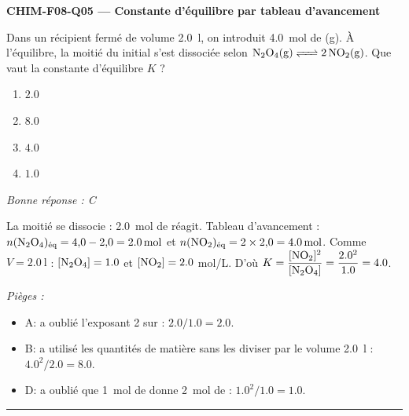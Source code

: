 \documentclass[11pt,a4paper]{article}
\begin{document}
\noindent\textbf{CHIM-F08-Q05 --- Constante d'équilibre par tableau d'avancement}\par
Dans un récipient fermé de volume \qty{2.0}{\litre}, on introduit \qty{4.0}{\mol} de (g). À l'équilibre, la moitié du  initial s'est dissociée selon $\ce{N2O4(g) <=> 2 NO2(g)}$. Que vaut la constante d'équilibre $K$ ?
\begin{enumerate}[label=\Alph*)]
\item $\num{2.0}$
\item $\num{8.0}$
\item $\num{4.0}$
\item $\num{1.0}$
\end{enumerate}
\textit{Bonne réponse : C}\par
La moitié se dissocie : \qty{2.0}{\mol} de  réagit. Tableau d'avancement : $n(\ce{N2O4})_{\text{éq}}=4{,}0-2{,}0=\qty{2.0}{\mol}$ et $n(\ce{NO2})_{\text{éq}}=2\times2{,}0=\qty{4.0}{\mol}$. Comme $V=\qty{2.0}{\litre}$ : $[\ce{N2O4}]=\num{1.0}$ et $[\ce{NO2}]=\num{2.0}$ mol/L. D'où $K=\dfrac{[\ce{NO2}]^2}{[\ce{N2O4}]}=\dfrac{\num{2.0}^2}{\num{1.0}}=\num{4.0}$.\par
\textit{Pièges :}
\begin{itemize}
\item A: a oublié l'exposant 2 sur  : $\num{2.0}/\num{1.0}=\num{2.0}$.
\item B: a utilisé les quantités de matière sans les diviser par le volume \qty{2.0}{\litre} : $\num{4.0}^2/\num{2.0}=\num{8.0}$.
\item D: a oublié que \qty{1}{\mol} de  donne \qty{2}{\mol} de  : $\num{1.0}^2/\num{1.0}=\num{1.0}$.
\end{itemize}
\vspace{8pt}\hrule\vspace{8pt}
\end{document}

